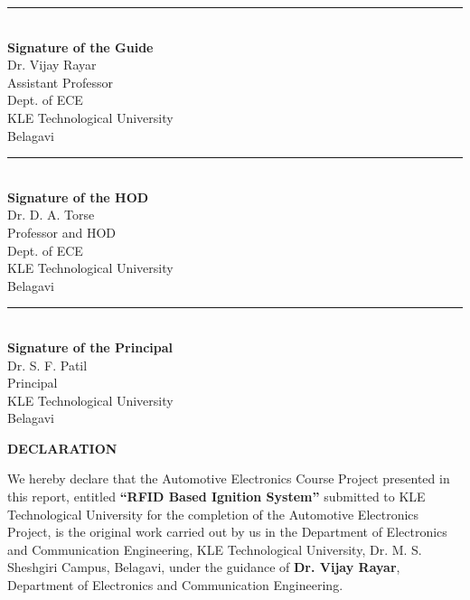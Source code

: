 \documentclass[12pt,a4paper,oneside]{report}
\begin{document}
\vspace{1.2cm}

\vspace{1.5cm}

\noindent
\begin{minipage}[t]{0.45\textwidth}
\centering
\rule{5cm}{0.4pt}\\[0.2cm]
\textbf{Signature of the Guide}\\[0.2cm]
Dr. Vijay Rayar\\
Assistant Professor\\
Dept. of ECE\\
KLE Technological University\\
Belagavi
\end{minipage}
\hfill
\begin{minipage}[t]{0.45\textwidth}
\centering
\rule{5cm}{0.4pt}\\[0.2cm]
\textbf{Signature of the HOD}\\[0.2cm]
Dr. D. A. Torse\\
Professor and HOD\\
Dept. of ECE\\
KLE Technological University\\
Belagavi
\end{minipage}

\vspace{2cm}

\begin{center}
\rule{5cm}{0.4pt}\\[0.2cm]
\textbf{Signature of the Principal}\\[0.2cm]
Dr. S. F. Patil\\
Principal\\
KLE Technological University\\
Belagavi
\end{center}

\newpage

\begin{center}
\textbf{\Large DECLARATION}
\end{center}

\vspace{1cm}

\large We hereby declare that the Automotive Electronics Course Project presented in this report, entitled \textbf{“RFID Based Ignition System”} submitted to KLE Technological University for the completion of the Automotive Electronics Project, is the original work carried out by us in the Department of Electronics and Communication Engineering, KLE Technological University, Dr. M. S. Sheshgiri Campus, Belagavi, under the guidance of \textbf{Dr. Vijay Rayar}, Department of Electronics and Communication Engineering.
\end{document}
